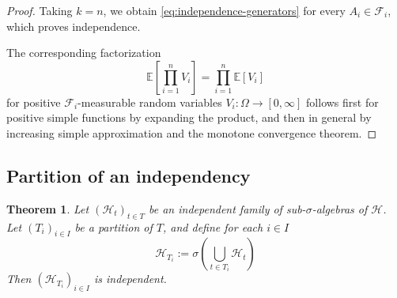 \documentclass[11pt, a4paper, openany]{book}
\newtheorem{thm}{Theorem}\newtheorem{lem}{Lemma}\newtheorem{crl}{Corollary}
\theoremstyle{definition}
\begin{document}
\begin{proof}
        Taking $k=n$, we obtain
        \eqref{eq:independence-generators} for every
        $A_i\in\mathscr{F}_i$, which proves independence.
    
        The corresponding factorization
        \[
            \mathbb{E}\left[\prod_{i=1}^n V_i\right]
            =
            \prod_{i=1}^n\mathbb{E}[V_i]
        \]
        for positive $\mathscr{F}_i$-measurable random variables
        $V_i:\Omega\rightarrow[0,\infty]$ follows first for
        positive simple functions by expanding the product,
        and then in general by increasing simple approximation
        and the monotone convergence theorem.
    \end{proof}
\subsection{Partition of an independency}
    \begin{thm}\label{partition of an independency}
        Let $(\mathscr{H}_t)_{t\in T}$ be an independent family
        of sub-$\sigma$-algebras of $\mathscr{H}$.
        Let $(T_i)_{i\in I}$ be a partition of $T$, and define for each $i\in I$
        \[
            \mathscr{H}_{T_i}
            :=
            \sigma\left(\bigcup_{t\in T_i}\mathscr{H}_t\right)
        \]
        Then $(\mathscr{H}_{T_i})_{i\in I}$ is independent.
    \end{thm}
\end{document}

